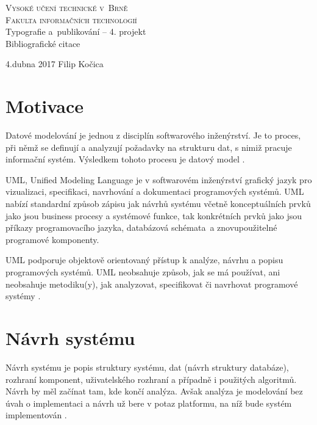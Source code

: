 \documentclass[11pt,a4paper,titlepage]{article}
\begin{document}
		\begin{titlepage}
    \begin{center}
		\textsc{\Huge{Vysoké učení technické v~Brně\\}
		\huge{Fakulta informačních technologií\\}}
		\LARGE{Typografie a~publikování -- 4. projekt\\}
		\Huge{Bibliografické citace\\}
		\end{center}
		\Large{4.dubna 2017 \hfill Filip Kočica}
		\end{titlepage}

    \section{Motivace}
    Datové modelování je jednou z disciplín softwarového inženýrství. Je to proces, při němž
    se definují a analyzují požadavky na strukturu dat, s nimiž pracuje informační systém.
    Výsledkem tohoto procesu je datový model \cite{Wikipedia:Dat_mod}.

    UML, Unified Modeling Language je v softwarovém inženýrství grafický jazyk pro vizualizaci,
    specifikaci, navrhování a dokumentaci programových systémů. UML nabízí standardní způsob
    zápisu jak návrhů systému včetně konceptuálních prvků jako jsou business procesy a systémové
    funkce, tak konkrétních prvků jako jsou příkazy programovacího jazyka, databázová schémata~a
    znovupoužitelné programové komponenty.

    UML podporuje objektově orientovaný přístup k analýze, návrhu a popisu programových systémů.
    UML neobsahuje způsob, jak se má používat, ani neobsahuje metodiku(y), jak analyzovat,
    specifikovat či navrhovat programové systémy \cite{Wikipedia:UML}.

    \section{Návrh systému}
    Návrh systému je popis struktury systému, dat (návrh struktury databáze), rozhraní
    komponent, uživatelského rozhraní a případně i použitých algoritmů. Návrh by měl začínat
    tam, kde končí analýza. Avšak analýza je modelování bez úvah o implementaci a návrh už bere
    v potaz platformu, na níž bude systém implementován \cite{Fiala:IS}.
\end{document}

